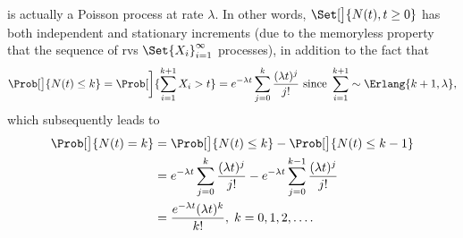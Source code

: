 \begin{Regular}
\begin{enumerate}[(1)]
              is actually a Poisson process at rate $ \lambda $. In other words, $ \Set[\big]{N(t),t\ge 0} $ has both
              independent and stationary increments (due to the memoryless property that the sequence of rvs $ \Set{X_i}_{i=1}^\infty $ processes),
              in addition to the fact that
              \[ \Prob[\big]{N(t)\le k}=\Prob[\bigg]{\sum_{i=1}^{k+1}X_i>t}=e^{-\lambda t}\sum_{j=0}^{k}\frac{(\lambda t)^j}{j!}\text{ since }\sum_{i=1}^{k+1}\sim \Erlang{k+1,\lambda}, \]
              which subsequently leads to
              \begin{align*}
                  \Prob[\big]{N(t)=k}
                   & =\Prob[\big]{N(t)\le k}-\Prob[\big]{N(t)\le k-1}                                                             \\
                   & =e^{-\lambda t}\sum_{j=0}^{k}\frac{(\lambda t)^j}{j!}-e^{-\lambda t}\sum_{j=0}^{k-1}\frac{(\lambda t)^j}{j!} \\
                   & =\frac{e^{-\lambda t}(\lambda t)^k}{k!},\; k=0,1,2,\ldots.
              \end{align*}
    \end{enumerate}
\end{Regular}
